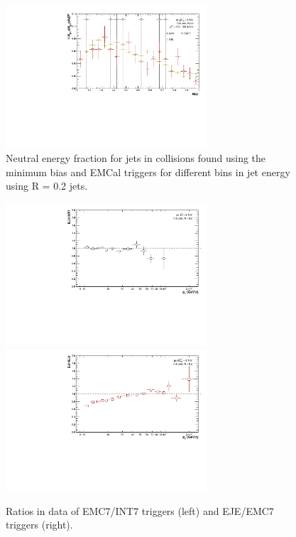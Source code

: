 \begin{figure}[h!]
\begin{multicols}{2}
            \includegraphics[width=7.5cm]{figures/NEF/All/hNEF_100-160GeV_R02.pdf}
        \vfill\null
    \end{multicols}
    \caption{Neutral energy fraction for jets in \pp collisions found using the minimum bias and EMCal triggers for different bins in jet energy using R = 0.2 jets.}
    \label{fig:NEF}
\end{figure}

\begin{figure}[h!]
    \centering
    \begin{multicols}{2}
            \includegraphics[width=7.5cm]{figures/TriggerSwap/ratio_EMCINT_data_R02.pdf}
        \vfill\null 
        \columnbreak
            \includegraphics[width=7.5cm]{figures/TriggerSwap/ratio_EJEEMC_data_R02.pdf}
        \vfill\null
    \end{multicols}
    \caption{Ratios in \pp data of EMC7/INT7 triggers (left) and EJE/EMC7 triggers (right).}
    \label{fig:trigger_ratios}
\end{figure}

